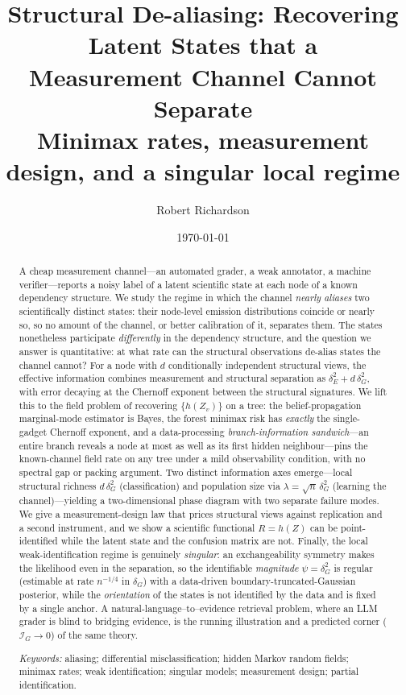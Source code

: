 \documentclass[11pt]{article}
\title{\textbf{Structural De-aliasing: Recovering Latent States that a\\ Measurement Channel Cannot Separate}\\[4pt]
\large Minimax rates, measurement design, and a singular local regime}
\author{Robert Richardson}
\date{\today}
\theoremstyle{plain}
\theoremstyle{definition}\newtheorem{definition}{Definition}\newtheorem{assumption}{Assumption}
\begin{document}
\maketitle

\begin{abstract}
A cheap measurement channel---an automated grader, a weak annotator, a machine verifier---reports a noisy label of
a latent scientific state at each node of a known dependency structure. We study the regime in which the channel
\emph{nearly aliases} two scientifically distinct states: their node-level emission distributions coincide or
nearly so, so no amount of the channel, or better calibration of it, separates them. The states nonetheless
participate \emph{differently} in the dependency structure, and the question we answer is quantitative: at what
rate can the structural observations de-alias states the channel cannot? For a node with $d$ conditionally
independent structural views, the effective information combines measurement and structural separation as
$\delta_E^2+d\,\delta_G^2$, with error decaying at the Chernoff exponent between the structural signatures. We lift
this to the field problem of recovering $\{h(Z_v)\}$ on a tree: the belief-propagation marginal-mode estimator is
Bayes, the forest minimax risk has \emph{exactly} the single-gadget Chernoff exponent, and a data-processing
\emph{branch-information sandwich}---an entire branch reveals a node at most as well as its first hidden
neighbour---pins the known-channel field rate on any tree under a mild observability condition, with no spectral
gap or packing argument. Two distinct information axes emerge---local structural richness $d\,\delta_G^2$
(classification) and population size via $\lambda=\sqrt n\,\delta_G^2$ (learning the channel)---yielding a
two-dimensional phase diagram with two separate failure modes. We give a measurement-design law that prices
structural views against replication and a second instrument, and we show a scientific functional $R=h(Z)$ can be
point-identified while the latent state and the confusion matrix are not. Finally, the local weak-identification
regime is genuinely \emph{singular}: an exchangeability symmetry makes the likelihood even in the separation, so
the identifiable \emph{magnitude} $\psi=\delta_G^2$ is regular (estimable at rate $n^{-1/4}$ in $\delta_G$) with a
data-driven boundary-truncated-Gaussian posterior, while the \emph{orientation} of the states is not identified by
the data and is fixed by a single anchor. A natural-language--to--evidence
retrieval problem, where an LLM grader is blind to bridging evidence, is the running illustration and a predicted
corner ($\mathcal I_G\!\to\!0$) of the same theory.

\smallskip\noindent\emph{Keywords:} aliasing; differential misclassification; hidden Markov random fields;
minimax rates; weak identification; singular models; measurement design; partial identification.
\end{abstract}
\end{document}
